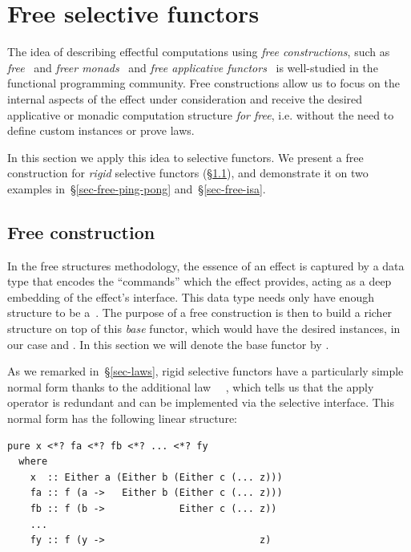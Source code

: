 \section{Free selective functors}\label{sec-free}

The idea of describing effectful computations using \emph{free constructions},
such as \emph{free}~\cite{swierstra2008data} and \emph{freer
monads}~\cite{kiselyov2015freer} and \emph{free applicative
functors}~\cite{free-applicatives} is well-studied in the functional programming
community. Free constructions allow us to focus on the internal aspects of the
effect under consideration and receive the desired applicative or monadic
computation structure \emph{for free}, i.e. without the need to define custom
instances or prove laws.

In this section we apply this idea to selective functors. We present a free
construction for \emph{rigid} selective functors
(\S\ref{sec-free-construction}), and demonstrate it on two examples
in~\S\ref{sec-free-ping-pong} and~\S\ref{sec-free-isa}.

\subsection{Free construction}\label{sec-free-construction}

In the free structures methodology, the essence of an effect is captured by a
data type that encodes the ``commands'' which the effect provides, acting as a
deep embedding of the effect's interface. This data type needs only have enough
structure to be a~. The purpose of a free construction is then to
build a richer structure on top of this \emph{base} functor, which would have
the desired instances, in our case  and . In this
section we will denote the base functor by .

As we remarked in~\S\ref{sec-laws}, rigid selective functors have a particularly
simple normal form thanks to the additional law \hs{(<*>)}~\hs{=}~,
which tells us that the apply operator \hs{<*>} is redundant and can be
implemented via the selective interface. This normal form has the following
linear structure:

\vspace{1mm}
\begin{verbatim}
pure x <*? fa <*? fb <*? ... <*? fy
  where
    x  :: Either a (Either b (Either c (... z)))
    fa :: f (a ->   Either b (Either c (... z)))
    fb :: f (b ->             Either c (... z))
    ...
    fy :: f (y ->                           z)
\end{verbatim}
\vspace{1mm}

